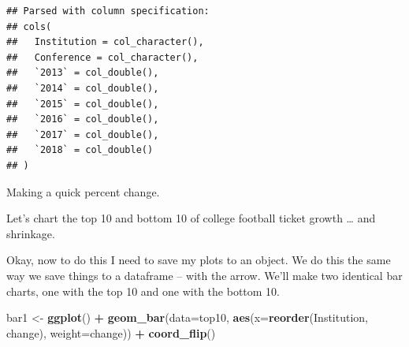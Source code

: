 \documentclass[]{book}
\newenvironment{Shaded}{\begin{snugshade}}{\end{snugshade}}
\newcommand{\DataTypeTok}[1]{\textcolor[rgb]{0.13,0.29,0.53}{#1}}
\newcommand{\DecValTok}[1]{\textcolor[rgb]{0.00,0.00,0.81}{#1}}
\newcommand{\KeywordTok}[1]{\textcolor[rgb]{0.13,0.29,0.53}{\textbf{#1}}}
\newcommand{\NormalTok}[1]{#1}
\newcommand{\OperatorTok}[1]{\textcolor[rgb]{0.81,0.36,0.00}{\textbf{#1}}}
\newcommand{\StringTok}[1]{\textcolor[rgb]{0.31,0.60,0.02}{#1}}
\begin{document}
\begin{verbatim}
## Parsed with column specification:
## cols(
##   Institution = col_character(),
##   Conference = col_character(),
##   `2013` = col_double(),
##   `2014` = col_double(),
##   `2015` = col_double(),
##   `2016` = col_double(),
##   `2017` = col_double(),
##   `2018` = col_double()
## )
\end{verbatim}

Making a quick percent change.

\begin{Shaded}
\end{Shaded}

Let's chart the top 10 and bottom 10 of college football ticket growth \ldots{} and shrinkage.

\begin{Shaded}
\end{Shaded}

Okay, now to do this I need to save my plots to an object. We do this the same way we save things to a dataframe -- with the arrow. We'll make two identical bar charts, one with the top 10 and one with the bottom 10.

\begin{Shaded}
\begin{Highlighting}[]
\NormalTok{bar1 <-}\StringTok{ }\KeywordTok{ggplot}\NormalTok{() }\OperatorTok{+}\StringTok{ }\KeywordTok{geom_bar}\NormalTok{(}\DataTypeTok{data=}\NormalTok{top10, }\KeywordTok{aes}\NormalTok{(}\DataTypeTok{x=}\KeywordTok{reorder}\NormalTok{(Institution, change), }\DataTypeTok{weight=}\NormalTok{change)) }\OperatorTok{+}\StringTok{ }\KeywordTok{coord_flip}\NormalTok{()}
\end{Highlighting}
\end{Shaded}
\end{document}
